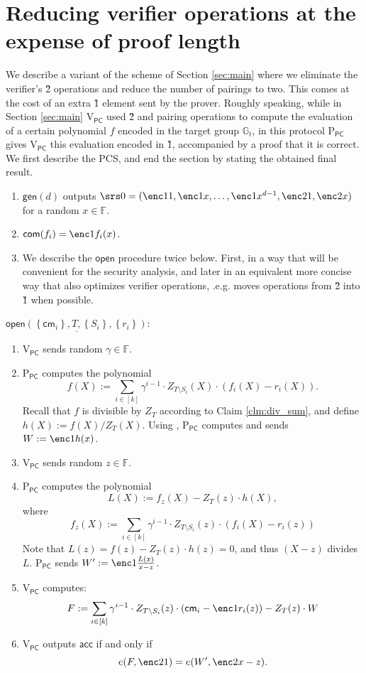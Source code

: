 \documentclass[11pt]{article} %
\newcommand{\Gt}{\ensuremath{{\mathbb G}_t}\xspace}
\newcommand{\F}{\ensuremath{\mathbb F}\xspace}
\newcommand{\com}{\ensuremath{\mathsf{com}}\xspace}
\newcommand{\cm}{\ensuremath{\mathsf{cm}}\xspace}
\newcommand{\open}{\ensuremath{\mathsf{open}}\xspace}
\newcommand{\acc}{\ensuremath{\mathsf{acc}}\xspace}
\newcommand{\defeq}{:=}
\newcommand{\gen}{\ensuremath{\mathsf{gen}}\xspace}
\newcommand{\prvpc}{\ensuremath{\mathrm{P_{\mathsf{PC}}}}\xspace}
\newcommand{\verpc}{\ensuremath{\mathrm{V_{\mathsf{PC}}}}\xspace}
\newcommand{\set}[1]{\ensuremath{\left\{#1\right\}}\xspace}
\begin{document}
\newpage
\section{Reducing verifier operations at the expense of proof length}\label{sec:secondpcs}

We describe a variant of the scheme of Section \ref{sec:main} where we eliminate the verifier's \G2 operations and reduce the number of pairings to two. This comes at the cost of an extra \G1 element sent by the prover. Roughly speaking, while in Section \ref{sec:main} \verpc used \G2 and pairing operations to compute the evaluation of a certain polynomial $f$ encoded in the target group \Gt, in this protocol \prvpc gives \verpc this evaluation encoded in \G1, accompanied by a proof that it is correct.
We first describe the PCS, and end the section by stating the obtained final result.


\begin{enumerate}
\item $\gen(d)$ outputs $\srs0 =(\enc1{1},\enc1{x},\ldots,\enc1{x^{d-1}},\enc2{1},\enc2{x})$ for a random $x\in \F$.
\item $\com(f_i)=\enc1{f_i(x)}$.
\item We describe the \open procedure twice below. First, in a way that will be convenient for the security analysis, and later in an equivalent more concise way that also optimizes verifier operations, .e.g. moves operations from \G2 into \G1 when possible.
\end{enumerate}

\noindent
$\underline{\open(\set{\cm_i},T,\set{S_i},\set{r_i})}$:
\begin{enumerate}
  \item \verpc sends random $\gamma\in \F$.
 \item \prvpc computes the polynomial
 \[f(X)\defeq \sum_{i\in [k]} \gamma^{i-1}\cdot Z_{T\setminus S_i}(X)\cdot (f_i(X)-r_i(X)).\]
 Recall that $f$ is divisible by $Z_T$ according to Claim \ref{clm:div_sum}, and define
 $h(X)\defeq f(X)/Z_T(X)$.
 Using , \prvpc computes and sends $W\defeq \enc1{h(x)}$.
 \item \verpc sends random $z\in \F$.

\item \prvpc computes the polynomial
\[L(X)\defeq f_z(X) - Z_T(z)\cdot h(X),\]
where 
\[f_z(X)\defeq \sum_{i\in [k]} \gamma^{i-1}\cdot Z_{T\setminus S_i}(z)\cdot (f_i(X)-r_i(z))\]
Note that $L(z)= f(z)- Z_T(z)\cdot h(z) =0$, and thus $(X-z)$ divides $L$.
\prvpc sends $W'\defeq \enc1{\frac{L(x)}{x-z}}$.

\item \verpc computes:
\[F\defeq \sum_{i\in [k]} \gamma^{i-1} \cdot Z_{T\setminus S_i}(z)\cdot (\cm_i - \enc1{r_i(z)}) - Z_T(z)\cdot W \]
 \item\label{stp:verchecksecond} \verpc outputs \acc if and only if
 \[ e(F,\enc2{1}) = e(W',\enc2{x-z}).\]

\end{enumerate}
\end{document}
